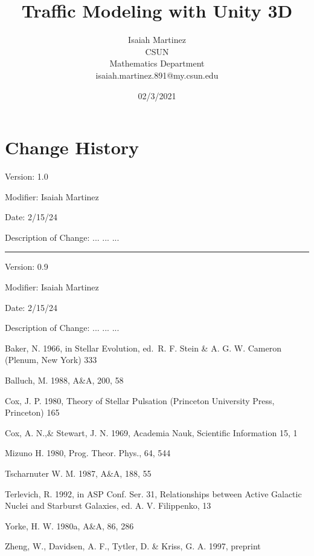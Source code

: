 \documentclass[a4paper,10pt]{article}
\begin{document}
%
    \title{Traffic Modeling with Unity 3D}

    \author{Isaiah Martinez \\ CSUN \\ Mathematics Department \\ isaiah.martinez.891@my.csun.edu}
          
    \date{02/3/2021}

    \maketitle
   
    \tableofcontents
 
    \newpage

    \section{Change History}

    Version: 1.0

    Modifier: Isaiah Martinez
    
    Date: 2/15/24
    
    Description of Change: ...
    ...
    ...
 
    \noindent\rule{12cm}{0.4pt}

    Version: 0.9

    Modifier: Isaiah Martinez
    
    Date: 2/15/24
    
    Description of Change: ...
    ...
    ...

    

    

    \begin{thebibliography}{}

     Baker, N. 1966,
        in Stellar Evolution,
        ed.\ R. F. Stein \& A. G. W. Cameron
        (Plenum, New York) 333

     Balluch, M. 1988,
        A\&A, 200, 58

     Cox, J. P. 1980,
        Theory of Stellar Pulsation
        (Princeton University Press, Princeton) 165

     Cox, A. N.,\& Stewart, J. N. 1969,
        Academia Nauk, Scientific Information 15, 1

     Mizuno H. 1980,
        Prog. Theor. Phys., 64, 544
    
     Tscharnuter W. M. 1987,
        A\&A, 188, 55
    
     Terlevich, R. 1992, in ASP Conf. Ser. 31, 
        Relationships between Active Galactic Nuclei and Starburst Galaxies, 
        ed. A. V. Filippenko, 13

     Yorke, H. W. 1980a,
        A\&A, 86, 286

     Zheng, W., Davidsen, A. F., Tytler, D. \& Kriss, G. A.
        1997, preprint
    \end{thebibliography}
\end{document}

